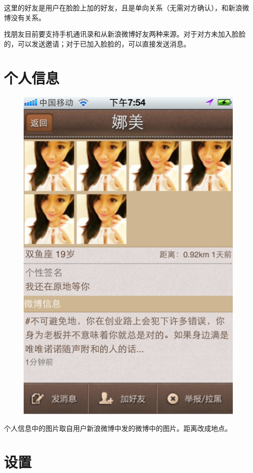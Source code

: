 \documentclass[cs4size]{ctexartutf8}
\begin{document}
这里的好友是用户在脸脸上加的好友，且是单向关系（无需对方确认），和新浪微博没有关系。

找朋友目前要支持手机通讯录和从新浪微博好友两种来源。对于对方未加入脸脸的，可以发送邀请；对于已加入脸脸的，可以直接发送消息。

\section{个人信息}

\begin{figure}[H]
\centering
\includegraphics[scale=0.5]{./9.png}
\end{figure}

个人信息中的图片取自用户新浪微博中发的微博中的图片。距离改成地点。

\section{设置}
\end{document}
